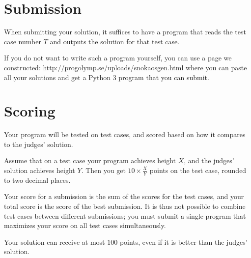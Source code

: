 \section*{Submission}
When submitting your solution, it suffices to have a program that reads the test case number $T$ and outputs the solution for that test case.

If you do not want to write such a program yourself, you can use a page we constructed: \url{http://progolymp.se/uploads/snokaosgen.html} where you can paste
all your solutions and get a Python 3 program that you can submit.

\section*{Scoring}
Your program will be tested on test cases, and scored based on how it compares to the judges' solution.

Assume that on a test case your program achieves height $X$, and the judges' solution achieves height $Y$. Then you get $10 \times \frac{X}{Y}$ points on the test case, rounded to two decimal places.

Your score for a submission is the sum of the scores for the test cases, and your total score is the score of the best submission. It is thus not possible to combine test cases between different submissions; you must submit a single program that maximizes your score on all test cases simultaneously.

Your solution can receive at most $100$ points, even if it is better than the judges' solution.
